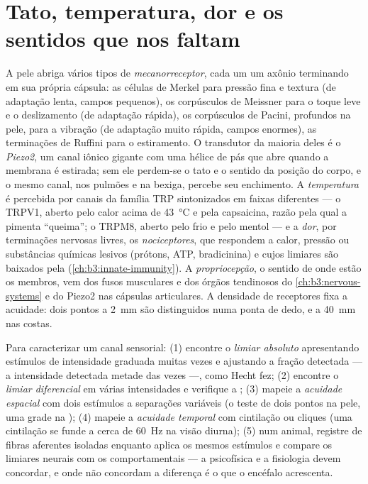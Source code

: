 \section{Tato, temperatura, dor e os sentidos que nos faltam}

\begin{definition}[Somatossensação]\label{def:b3:sensory-systems:somato}
A pele abriga vários tipos de \emph{mecanorreceptor}, cada um um axônio
terminando em sua própria cápsula: as células de Merkel para pressão
fina e textura (de adaptação lenta, campos pequenos), os corpúsculos de
Meissner para o toque leve e o deslizamento (de adaptação rápida), os
corpúsculos de Pacini, profundos na pele, para a vibração (de adaptação
muito rápida, campos enormes), as terminações de Ruffini para o
estiramento. O transdutor da maioria deles é o \emph{Piezo2}, um canal
iônico gigante com uma hélice de pás que abre quando a membrana é
estirada; sem ele perdem-se o tato e o sentido da posição do corpo, e o
mesmo canal, nos pulmões e na bexiga, percebe seu enchimento. A
\emph{temperatura} é percebida por canais da família TRP sintonizados em
faixas diferentes --- o TRPV1, aberto pelo calor acima de
\qty{43}{\celsius} e pela capsaicina, razão pela qual a pimenta
``queima''; o TRPM8, aberto pelo frio e pelo mentol --- e a \emph{dor},
por terminações nervosas livres, os \emph{nociceptores}, que respondem a
calor, pressão ou substâncias químicas lesivos (prótons, ATP,
bradicinina) e cujos limiares são baixados pela 
(\cref{ch:b3:innate-immunity}). A \emph{propriocepção}, o sentido de
onde estão os membros, vem dos fusos musculares e dos órgãos tendinosos
do \cref{ch:b3:nervous-systems} e do Piezo2 nas cápsulas articulares. A
densidade de receptores fixa a acuidade: dois pontos a \qty{2}{mm} são
distinguidos numa ponta de dedo, e a \qty{40}{mm} nas costas.
\end{definition}

\begin{method}\label{met:b3:sensory-systems:psychophysics}
Para caracterizar um canal sensorial: (1) encontre o \emph{limiar
absoluto} apresentando estímulos de intensidade graduada muitas vezes e
ajustando a fração detectada --- a intensidade detectada metade das
vezes ---, como Hecht fez; (2) encontre o \emph{limiar diferencial} em
várias intensidades e verifique a ; (3) mapeie a
\emph{acuidade espacial} com dois estímulos a separações variáveis (o
teste de dois pontos na pele, uma grade na ); (4) mapeie a
\emph{acuidade temporal} com cintilação ou cliques (uma cintilação se
funde a cerca de \qty{60}{Hz} na visão diurna); (5) num animal, registre
de fibras aferentes isoladas enquanto aplica os mesmos estímulos e
compare os limiares neurais com os comportamentais --- a psicofísica e a
fisiologia devem concordar, e onde não concordam a diferença é o que o
encéfalo acrescenta.
\end{method}

